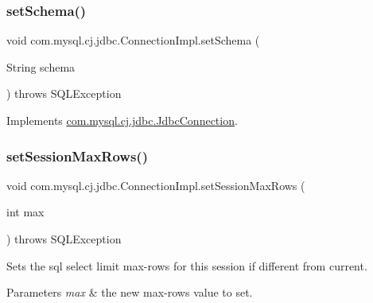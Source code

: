 \mbox{\label{classcom_1_1mysql_1_1cj_1_1jdbc_1_1_connection_impl_a33c175b4c5e5e8fe812a28d24ea180e2}} 
\subsubsection{\texorpdfstring{set\+Schema()}{setSchema()}}
{\footnotesize\ttfamily void com.\+mysql.\+cj.\+jdbc.\+Connection\+Impl.\+set\+Schema (\begin{DoxyParamCaption}\item[{String}]{schema }\end{DoxyParamCaption}) throws S\+Q\+L\+Exception}



Implements \mbox{\hyperlink{interfacecom_1_1mysql_1_1cj_1_1jdbc_1_1_jdbc_connection_a7f187665ea1dcc0a9a77cdc7cb56dc52}{com.\+mysql.\+cj.\+jdbc.\+Jdbc\+Connection}}.

\mbox{\label{classcom_1_1mysql_1_1cj_1_1jdbc_1_1_connection_impl_ae55ba5618d7116e5db7ac647ab771087}} 
\subsubsection{\texorpdfstring{set\+Session\+Max\+Rows()}{setSessionMaxRows()}}
{\footnotesize\ttfamily void com.\+mysql.\+cj.\+jdbc.\+Connection\+Impl.\+set\+Session\+Max\+Rows (\begin{DoxyParamCaption}\item[{int}]{max }\end{DoxyParamCaption}) throws S\+Q\+L\+Exception}

Sets the sql select limit max-\/rows for this session if different from current.


\begin{DoxyParams}{Parameters}
{\em max} & the new max-\/rows value to set. \\
\hline
\end{DoxyParams}

